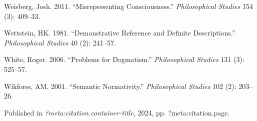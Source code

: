 \documentclass[
  10pt,
  letterpaper,
  DIV=11,
  numbers=noendperiod,
  twoside]{scrartcl}
\newlength{\cslhangindent}
\newenvironment{CSLReferences}[2] %
 {\begin{list}{}{%
  \setlength{\itemindent}{0pt}
  \setlength{\leftmargin}{0pt}
  \setlength{\parsep}{0pt}
  \ifodd #1
   \setlength{\leftmargin}{\cslhangindent}
   \setlength{\itemindent}{-1\cslhangindent}
  \fi
  \setlength{\itemsep}{#2\baselineskip}}}
 {\end{list}}
\begin{document}
\begin{CSLReferences}{1}{0}
Weisberg, Josh. 2011. {``Misrepresenting Consciousness.''}
\emph{Philosophical Studies} 154 (3): 409--33.

Wettstein, HK. 1981. {``Demonstrative Reference and Definite
Descriptions.''} \emph{Philosophical Studies} 40 (2): 241--57.

White, Roger. 2006. {``Problems for Dogmatism.''} \emph{Philosophical
Studies} 131 (3): 525--57.

Wikforss, AM. 2001. {``Semantic Normativity.''} \emph{Philosophical
Studies} 102 (2): 203--26.

\end{CSLReferences}



\noindent Published in\emph{
?meta:citation.container-title}, 2024, pp. ?meta:citation.page.
\end{document}
